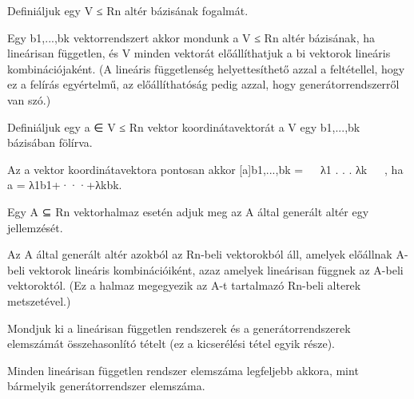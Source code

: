 \begin{frame}
  \begin{tcolorbox}[title={6}]
      Deﬁniáljuk egy V ≤ Rn altér bázisának fogalmát.


  \tcblower
Egy b1,...,bk vektorrendszert akkor mondunk a V ≤ Rn altér bázisának, ha lineárisan független, és V minden vektorát előállíthatjuk a bi vektorok lineáris kombinációjaként. (A lineáris függetlenség helyettesíthető azzal a feltétellel, hogy ez a felírás egyértelmű, az előállíthatóság pedig azzal, hogy generátorrendszerről van szó.)
  \end{tcolorbox}
\end{frame}


\begin{frame}
  \begin{tcolorbox}[title={7}]
      Deﬁniáljuk egy a ∈ V ≤ Rn vektor koordinátavektorát a V egy b1,...,bk bázisában fölírva.


  \tcblower
Az a vektor koordinátavektora pontosan akkor [a]b1,...,bk =
 
λ1 . . . λk
 
, ha a = λ1b1+···+λkbk.
  \end{tcolorbox}
\end{frame}


\begin{frame}
  \begin{tcolorbox}[title={8}]
       Egy A ⊆ Rn vektorhalmaz esetén adjuk meg az A által generált altér egy jellemzését.


  \tcblower
Az A által generált altér azokból az Rn-beli vektorokból áll, amelyek előállnak A-beli vektorok lineáris kombinációiként, azaz amelyek lineárisan függnek az A-beli vektoroktól. (Ez a halmaz megegyezik az A-t tartalmazó Rn-beli alterek metszetével.)

  \end{tcolorbox}
\end{frame}



\begin{frame}
  \begin{tcolorbox}[title={9}]
     Mondjuk ki a lineárisan független rendszerek és a generátorrendszerek elemszámát összehasonlító tételt (ez a kicserélési tétel egyik része).



  \tcblower
Minden lineárisan független rendszer elemszáma legfeljebb akkora, mint bármelyik generátorrendszer elemszáma.

  \end{tcolorbox}
\end{frame}


